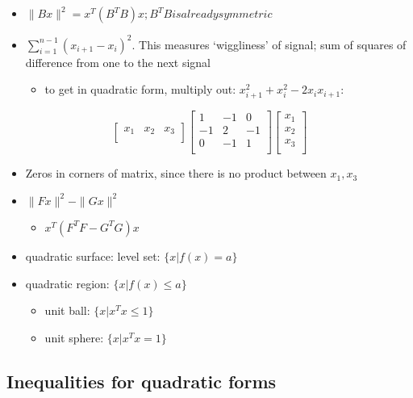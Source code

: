 \documentclass[10pt,letterpaper]{article}
\begin{document}
\begin{itemize}
\item $\| B x \| ^{2} = x ^{T} (B ^{T} B)x; B ^{T} B is already symmetric$
\item $\sum ^{n-1} _{i=1} (x _{i+1} - x _{i} ) ^{2}$. This measures `wiggliness' of signal; sum of squares of difference from one to the next signal

\begin{itemize}
\item to get in quadratic form, multiply out: $x ^{2} _{i+1} + x ^{2} _{i} - 2 x _{i} x _{i+1}$:
\end{itemize}

\end{itemize}
$$
\begin{bmatrix}
  x_1 & x_2 & x_3 \\
\end{bmatrix}
\begin{bmatrix}
   1 & -1 &  0 \\
  -1 &  2 & -1 \\
   0 & -1 &  1 \\
\end{bmatrix}
\begin{bmatrix}
  x_1 \\
  x_2 \\
  x_3 \\
\end{bmatrix}
$$ 
\begin{itemize}
\item Zeros in corners of matrix, since there is no product between $x_1,x_3$
\item $\| Fx \| ^{2} - \| Gx \| ^{2}$

\begin{itemize}
\item $x ^{T} (F ^{T} F-G ^{T} G) x$
\end{itemize}

\item quadratic surface: level set: $\{ x| f(x) = a\}$
\item quadratic region: $\{ x|f(x) \le a \}$

\begin{itemize}
\item unit ball: $\{x | x ^{T} x \le 1\}$
\item unit sphere: $\{x | x ^{T} x = 1\}$
\end{itemize}

\end{itemize}
\subsection{Inequalities for quadratic forms}
\label{sec-15_3}
\end{document}
